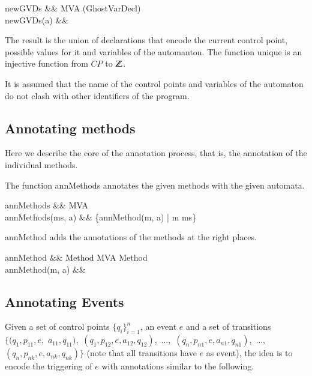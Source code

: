 \documentclass[a4paper,10pt]{article}
\begin{document}
\begin{haskell}\label{def:newGVDs}
newGVDs &\ofType& MVA \to \powerset(GhostVarDecl)\\
newGVDs(a) &\eqdef&
\end{haskell}

The result is the union of declarations that encode the current control point, possible values for it and 
variables of the automanton. 
The function \<unique\> is an injective function from $CP$ to ${\mathbb Z}$.

It is assumed that the name of the control points and variables of the automaton do not clash with other
identifiers of the program.


\subsection{Annotating methods}\label{sec:AnnMethods}
Here we describe the core of the annotation process, that is, the annotation of the individual methods.

The function \<annMethods\> annotates the given methods with the given automata.
\begin{haskell}\label{def:annMethods}
annMethods &\ofType& \Methods \times MVA \to \Methods\\
annMethods(ms, a) &\eqdef& \{annMethod(m, a) | m \in ms\}\\
\end{haskell}

\<annMethod\> adds the annotations of the methods at the right places.
\begin{haskell}\label{def:annMethod}
annMethod &\ofType& Method \times MVA \to Method\\
annMethod(m, a) &\eqdef& 
\end{haskell}


\subsection{Annotating Events}\label{sec:AnnEvents}
Given a set of control points $\{q_i\}_{i=1}^n$, an event $e$ and a set of transitions $\{(q_1, p_{11},e,$
$a_{11}, q_{11}),$ $(q_1, p_{12}, e, a_{12}, q_{12}),$ $\ldots,$ $(q_n, p_{n1}, e, a_{n1},
q_{n1}),$ $\ldots,$ $(q_n, p_{nk}, e, a_{nk}, q_{nk})\}$ (note that all transitions have $e$ as event), the
idea is to encode the triggering of $e$ with annotations similar to the following.
\end{document}

